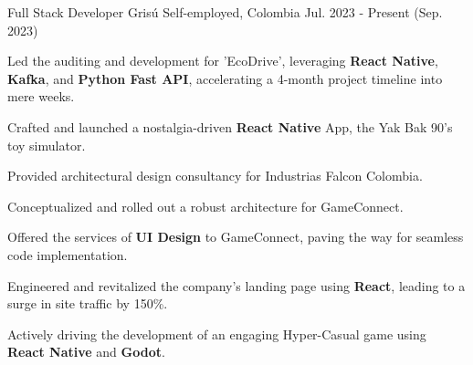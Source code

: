 \newcommand{\quotes}[1]{``#1''}

\begin{cventries}

  \cventry
  {Full Stack Developer} %
  {Grisú} %
  {Self-employed, Colombia} %
  {Jul. 2023 - Present (Sep. 2023)} %
  {
    \begin{cvitems} %
      \item {Led the auditing and development for 'EcoDrive', leveraging \textbf{React Native}, \textbf{Kafka}, and \textbf{Python Fast API}, accelerating a 4-month project timeline into mere weeks.}
      \item {Crafted and launched a nostalgia-driven \textbf{React Native} App, the Yak Bak 90's toy simulator.}
      \item {Provided architectural design consultancy for Industrias Falcon Colombia.}
      \item {Conceptualized and rolled out a robust architecture for GameConnect.}
      \item {Offered the services of \textbf{UI Design} to GameConnect, paving the way for seamless code implementation.}
      \item {Engineered and revitalized the company's landing page using \textbf{React}, leading to a surge in site traffic by 150\%.}
      \item {Actively driving the development of an engaging Hyper-Casual game using \textbf{React Native} and \textbf{Godot}.}
    \end{cvitems}
  }


\end{cventries}
